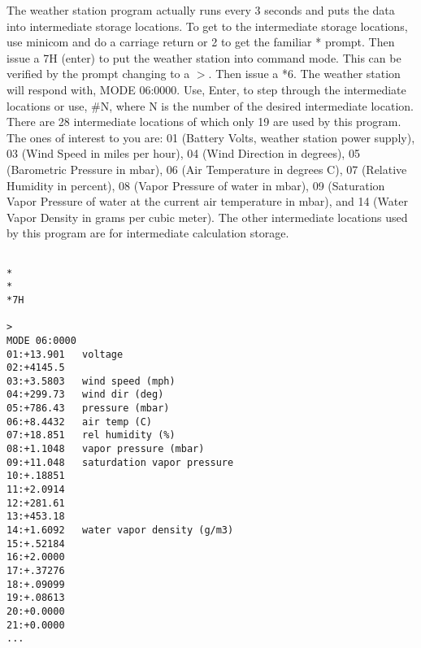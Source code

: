 \documentclass[11pt]{article}
\begin{document}
The weather station program actually runs every 3 seconds and puts the data into
intermediate storage locations. To get to the intermediate
storage locations, use minicom and do a carriage return or 2 to get the 
familiar * prompt. Then
issue a 7H (enter) to put the weather station into command mode. This
can be verified by the prompt changing to a $>$. Then issue a *6. The
weather station will respond with, MODE 06:0000. Use, Enter, to step
through the intermediate locations or use, \#N, where N is the number of
the desired intermediate location. There are 28 intermediate locations
of which only 19 are used by this program. The ones of interest to you
are: 01 (Battery Volts, weather station power supply), 03 (Wind Speed in
miles per hour), 04 (Wind Direction in degrees), 05 (Barometric Pressure
in mbar), 06 (Air Temperature in degrees C), 07 (Relative Humidity in
percent), 08 (Vapor Pressure of water in mbar), 09 (Saturation Vapor
Pressure of water at the current air temperature in mbar), and 14 (Water
Vapor Density in grams per cubic meter). The other intermediate
locations used by this program are for intermediate calculation storage.

\footnotesize
\begin{verbatim}

*
*
*7H                                                                                                                                        
                                                                                                                                           
>                                                                                                                                          
MODE 06:0000
01:+13.901   voltage
02:+4145.5   
03:+3.5803   wind speed (mph)
04:+299.73   wind dir (deg)
05:+786.43   pressure (mbar)
06:+8.4432   air temp (C)
07:+18.851   rel humidity (%)                                                                                                                  
08:+1.1048   vapor pressure (mbar)
09:+11.048   saturdation vapor pressure
10:+.18851                                                                                                                                 
11:+2.0914
12:+281.61
13:+453.18
14:+1.6092   water vapor density (g/m3)
15:+.52184
16:+2.0000
17:+.37276
18:+.09099
19:+.08613
20:+0.0000
21:+0.0000
...
          
\end{verbatim}
\footnotesize
\end{document}
